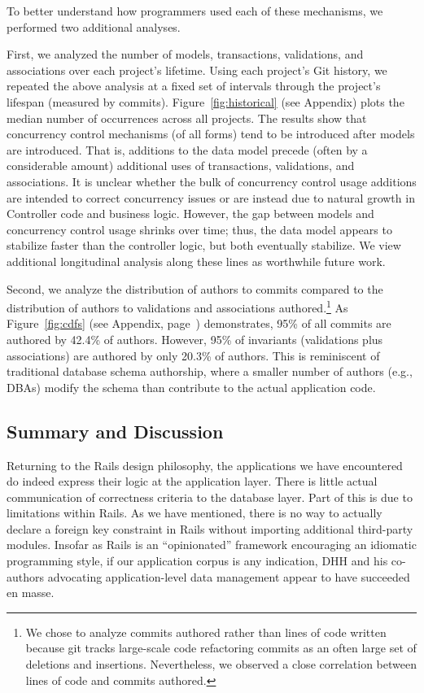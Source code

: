  To better understand how programmers
used each of these mechanisms, we performed two additional
analyses.

First, we analyzed the number of models, transactions, validations,
and associations over each project's lifetime. Using each project's
Git history, we repeated the above analysis at a fixed set of
intervals through the project's lifespan (measured by
commits). Figure~\ref{fig:historical} (see Appendix) plots the median
number of occurrences across all projects. The results show that
concurrency control mechanisms (of all forms) tend to be introduced
after models are introduced. That is, additions to the data model
precede (often by a considerable amount) additional uses of
transactions, validations, and associations. It is unclear whether the
bulk of concurrency control usage additions are intended to correct
concurrency issues or are instead due to natural growth in Controller
code and business logic. However, the gap between models and
concurrency control usage shrinks over time; thus, the data model
appears to stabilize faster than the controller logic, but both
eventually stabilize. We view additional longitudinal analysis along
these lines as worthwhile future work.


Second, we analyze the distribution of authors to commits compared to
the distribution of authors to validations and associations
authored.\footnote{We chose to analyze commits authored rather than
  lines of code written because git tracks large-scale code
  refactoring commits as an often large set of deletions and
  insertions. Nevertheless, we observed a close correlation between
  lines of code and commits authored.} As Figure~\ref{fig:cdfs} (see
Appendix, page~\pageref{fig:cdfs}) demonstrates, 95\% of all commits are authored by 42.4\% of
authors. However, 95\% of invariants (validations plus associations)
are authored by only 20.3\% of authors. This is reminiscent of
traditional database schema authorship, where a smaller number of
authors (e.g., DBAs) modify the schema than contribute to the actual
application code.


\subsection{Summary and Discussion}

Returning to the Rails design philosophy, the applications we have
encountered do indeed express their logic at the application
layer. There is little actual communication of correctness criteria to
the database layer. Part of this is due to limitations within
Rails. As we have mentioned, there is no way to actually declare a
foreign key constraint in Rails without importing additional
third-party modules. Insofar as Rails is an ``opinionated'' framework
encouraging an idiomatic programming style, if our application corpus
is any indication, DHH and his co-authors advocating application-level
data management appear to have succeeded en masse.

